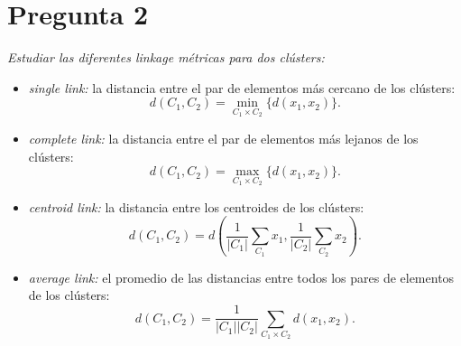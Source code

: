\documentclass[spanish]{article}
\newcommand{\pregunta}{\textit}
\newcommand{\card}[1]{\lvert#1\rvert}
\begin{document}
\section*{Pregunta 2}
\pregunta{Estudiar las diferentes linkage métricas para dos clústers:}
\begin{itemize}
    \item \pregunta{single link:} la distancia entre el par de elementos más cercano de los
        clústers:
        \[d(C_1, C_2) = \min_{C_1\times C_2}\bigl\{d(x_1, x_2)\bigr\}.\]
    \item \pregunta{complete link:} la distancia entre el par de elementos más lejanos de los
        clústers:
        \[d(C_1, C_2) = \max_{C_1\times C_2}\bigl\{d(x_1, x_2)\bigr\}.\]
    \item \pregunta{centroid link:} la distancia entre los centroides de los clústers:
        \[d(C_1, C_2) = d\left(\frac{1}{\card{C_1}}\sum_{C_1} x_1, \frac{1}{\card{C_2}}\sum_{C_2} x_2\right).\]
    \item \pregunta{average link:} el promedio de las distancias entre todos los pares de elementos
        de los clústers:
        \[d(C_1, C_2) = \frac{1}{\card{C_1}\card{C_2}}\sum_{C_1\times C_2} d(x_1, x_2).\]
\end{itemize}
\end{document}
